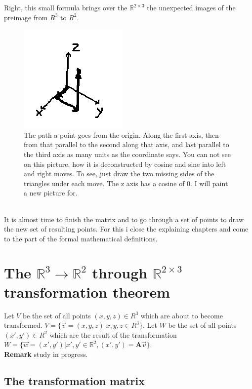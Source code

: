 \documentclass[a4paper]{article}
\begin{document}
Right, this small formula brings over the $\mathbb{R}^{2\times{3}}$ the unexpected images of the preimage from $R^3$ to $R^2$.\\

\begin{figure}[ht]
\includegraphics{pathcoords.png}
\caption{The path a point goes from the origin. Along the first axis, then from that parallel to the second along that axis, and last parallel to the third axis as many units as the coordinate says. You can not see on this picture, how it is deconstructed by cosine and sine into left and right moves. To see, just draw the two missing sides of the triangles under each move. The z axis has a cosine of 0. I will paint a new picture for.}
\end{figure}\\

It is almost time to finish the matrix and to go through a set of points to draw the new set of resulting points.
For this i close the explaining chapters and come to the part of the formal mathematical definitions.\\


\section{The $\mathbb{R}^{3} \rightarrow \mathbb{R}^{2}$ through $\mathbb{R}^{2\times{3}}$ transformation theorem}



Let $V$ be the set of all points $(x,y,z) \in R^3$ which are about to become transformed. $V = \{ \vec{v}=(x,y,z) | x,y,z \in R^3 \}$.
Let $W$ be the set of all points $(x',y') \in R^2$ which are the result of the transformation $W = \{ \vec{w}=(x',y') | x',y' \in \mathbb{R}^{2}, (x',y')=\boldsymbol{A}\vec{v}\}$.\\

\textbf{Remark} study in progress.



\subsection{The transformation matrix}
\end{document}
